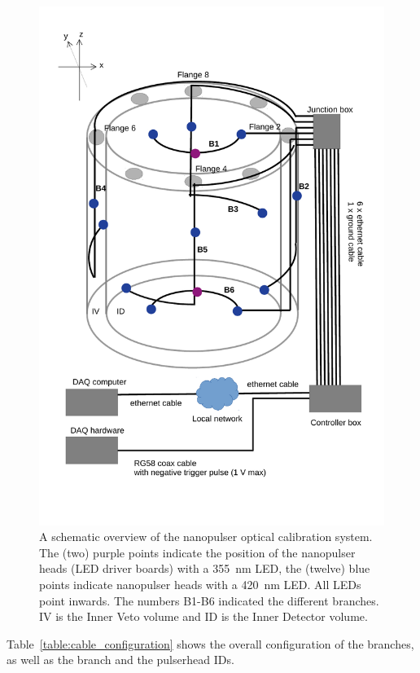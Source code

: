 \begin{figure}
\begin{center}	
  \includegraphics[width=0.75\linewidth]{figures/JSNS2_led_system_overview.pdf}
  \caption{A schematic overview of the nanopulser optical calibration system. The (two) purple points indicate the position of the nanopulser heads (LED driver boards) with a 355~nm LED, the (twelve) blue points indicate nanopulser heads with a 420~nm LED. All LEDs point inwards. The numbers B1-B6 indicated the different branches. IV is the Inner Veto volume and ID is the Inner Detector volume.}
  \label{figure:controlbox}
\end{center}
\end{figure}

Table~\ref{table:cable_configuration} shows the overall configuration of the branches, as well as the branch and the pulserhead IDs.


